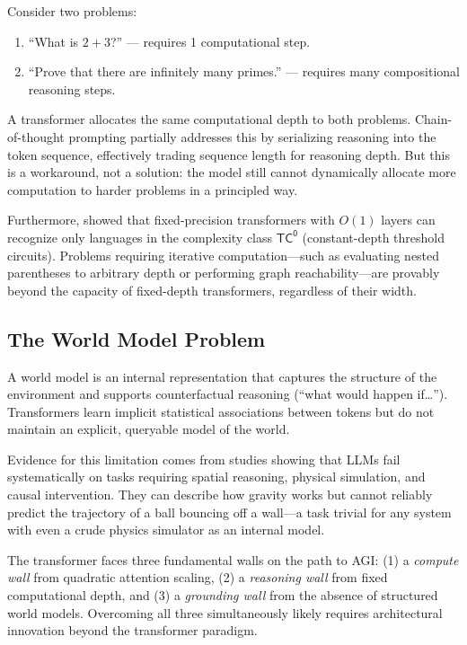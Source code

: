 \begin{example}
Consider two problems:
\begin{enumerate}[leftmargin=1.8em]
  \item ``What is $2 + 3$?'' --- requires 1 computational step.
  \item ``Prove that there are infinitely many primes.'' --- requires many compositional reasoning steps.
\end{enumerate}
A transformer allocates the same computational depth to both problems. Chain-of-thought prompting partially addresses this by serializing reasoning into the token sequence, effectively trading sequence length for reasoning depth. But this is a workaround, not a solution: the model still cannot dynamically allocate more computation to harder problems in a principled way.
\end{example}

Furthermore, \citet{merrill2023expressive} showed that fixed-precision transformers with $O(1)$ layers can recognize only languages in the complexity class $\mathsf{TC^0}$ (constant-depth threshold circuits). Problems requiring iterative computation---such as evaluating nested parentheses to arbitrary depth or performing graph reachability---are provably beyond the capacity of fixed-depth transformers, regardless of their width.

\subsection{The World Model Problem}

A world model is an internal representation that captures the structure of the environment and supports counterfactual reasoning (``what would happen if\ldots''). Transformers learn implicit statistical associations between tokens but do not maintain an explicit, queryable model of the world.

Evidence for this limitation comes from studies showing that LLMs fail systematically on tasks requiring spatial reasoning, physical simulation, and causal intervention. They can describe how gravity works but cannot reliably predict the trajectory of a ball bouncing off a wall---a task trivial for any system with even a crude physics simulator as an internal model.

\begin{keyinsight}
The transformer faces three fundamental walls on the path to AGI: (1) a \emph{compute wall} from quadratic attention scaling, (2) a \emph{reasoning wall} from fixed computational depth, and (3) a \emph{grounding wall} from the absence of structured world models. Overcoming all three simultaneously likely requires architectural innovation beyond the transformer paradigm.
\end{keyinsight}

